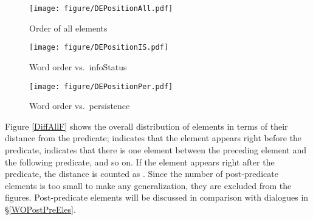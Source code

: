 \begin{figure}
	\texttt{[image: figure/DEPositionAll.pdf]}
	\caption{Order of all elements}
	\label{DEPositionAllF}
\end{figure}
\begin{figure}
	\texttt{[image: figure/DEPositionIS.pdf]}
	\caption{Word order vs.\ infoStatus}
	\label{DEPositionISF}
\end{figure}
\begin{figure}
	\texttt{[image: figure/DEPositionPer.pdf]}
	\caption{Word order vs.\ persistence}
	\label{DEPositionPerF}
\end{figure}


Figure \ref{DiffAllF} shows the overall distribution of elements in terms of their distance from the predicate;
 indicates that the element appears right before the predicate,
 indicates that there is one element between the preceding element and the following predicate, and so on.
If the element appears right after the predicate,
the distance is counted as .
Since the number of post-predicate elements is too small to make any generalization, they are excluded from the figures.
Post-predicate elements will be discussed in comparison with dialogues in \S \ref{WOPostPreEles}.

